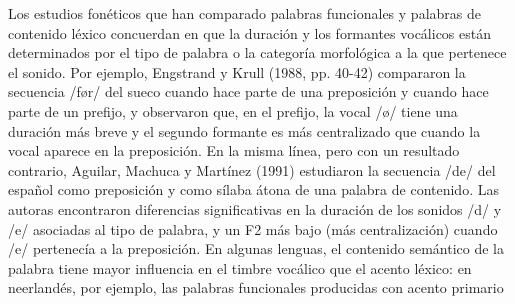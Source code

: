 Los estudios fonéticos que han comparado palabras funcionales y palabras de contenido léxico concuerdan en que la duración y los formantes vocálicos están determinados por el tipo de palabra o la categoría morfológica a la que pertenece el sonido. Por ejemplo, Engstrand y Krull (1988, pp. 40-42) compararon la secuencia /før/ del sueco cuando hace parte de una preposición y cuando hace parte de un prefijo, y observaron que, en el prefijo, la vocal /ø/ tiene una duración más breve y el segundo formante es más centralizado que cuando la vocal aparece en la preposición. En la misma línea, pero con un resultado contrario, Aguilar, Machuca y Martínez (1991) estudiaron la secuencia /de/ del español como preposición y como sílaba átona de una palabra de contenido. Las autoras encontraron diferencias significativas en la duración de los sonidos /d/ y /e/ asociadas al tipo de palabra, y un F2 más bajo (más centralización) cuando /e/ pertenecía a la preposición. En algunas lenguas, el contenido semántico de la palabra tiene mayor influencia en el timbre vocálico que el acento léxico: en neerlandés, por ejemplo, las palabras funcionales producidas con acento primario 